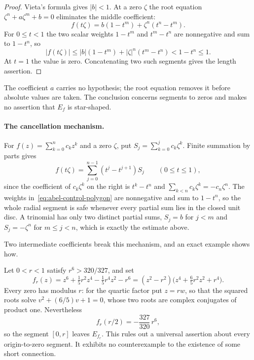 \documentclass[11pt]{article}
\begin{document}
\begin{proof}
Vieta's formula gives $|b|<1$.  At a zero $\zeta$ the root equation
$\zeta^n+a\zeta^m+b=0$ eliminates the middle coefficient:
\begin{equation}\label{eq:trinomial-cancellation}
 f(t\zeta)=b(1-t^m)+\zeta^n(t^n-t^m).
\end{equation}
For $0\le t<1$ the two scalar weights $1-t^m$ and $t^m-t^n$ are nonnegative
and sum to $1-t^n$, so
\[
 |f(t\zeta)|\le|b|(1-t^m)+|\zeta|^n(t^m-t^n)<1-t^n\le1 .
\]
At $t=1$ the value is zero.  Concatenating two such segments gives the length
assertion.
\end{proof}

The coefficient $a$ carries no hypothesis; the root equation removes it before
absolute values are taken.  The conclusion concerns segments to zeros and
makes no assertion that $E_f$ is star-shaped.

\paragraph{The cancellation mechanism.}
\label{subsec:abel-mechanism}
For $f(z)=\sum_{k=0}^nc_kz^k$ and a zero $\zeta$, put
$S_j=\sum_{k=0}^jc_k\zeta^k$.  Finite summation by parts gives
\begin{equation}\label{eq:abel-control-polygon}
 f(t\zeta)=\sum_{j=0}^{n-1}(t^j-t^{j+1})S_j\qquad(0\le t\le1),
\end{equation}
since the coefficient of $c_k\zeta^k$ on the right is $t^k-t^n$ and
$\sum_{k<n}c_k\zeta^k=-c_n\zeta^n$.  The weights
in~\eqref{eq:abel-control-polygon} are nonnegative and sum to $1-t^n$, so the
whole radial segment is safe whenever every partial sum lies in the closed
unit disc.  A trinomial has only two distinct partial sums, $S_j=b$ for $j<m$
and $S_j=-\zeta^n$ for $m\le j<n$, which is exactly the estimate above.

Two intermediate coefficients break this mechanism, and an exact example shows
how.

\begin{example}\label{ex:sextic-spoke}
Let $0<r<1$ satisfy $r^6>320/327$, and set
\[
 f_r(z)=z^6+\tfrac15r^2z^4-\tfrac15r^4z^2-r^6
       =(z^2-r^2)\bigl(z^4+\tfrac65r^2z^2+r^4\bigr).
\]
Every zero has modulus $r$: for the quartic factor put $z=rw$, so that the
squared roots solve $v^2+(6/5)v+1=0$, whose two roots are complex conjugates
of product one.  Nevertheless
\[
 f_r(r/2)=-\frac{327}{320}\,r^6,
\]
so the segment $[0,r]$ leaves $E_{f_r}$.  This rules out a universal assertion
about every origin-to-zero segment.  It exhibits no counterexample to the
existence of some short connection.
\end{example}
\end{document}
